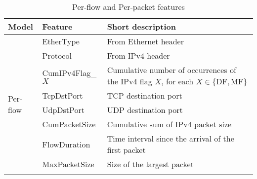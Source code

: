 \begin{table}[t]
\caption{Per-flow and Per-packet features}
\begin{tabular}{|l|l|p{4.2cm}|}
\hline
\textbf{Model}      & \textbf{Feature} & \textbf{Short description}                                                                                                                                                                \\ \hline
\multirow{11}{*}{Per-flow}  & EtherType        & From Ethernet header                                                                                                                                                                      \\ \cline{2-3} 
                            & Protocol         & From IPv4 header                                                                                                                                                                          \\ \cline{2-3} 
                            & CumIPv4Flag\_$X$ & Cumulative number of occurrences of the IPv4 flag $X$, for each $X\in\{\text{DF}, \text{MF}\}$                                                                                            \\ \cline{2-3} 
                            & TcpDstPort       & TCP destination port                                                                                                                                                                      \\ \cline{2-3} 
                            & UdpDstPort       & UDP destination port                                                                                                                                                                      \\ \cline{2-3} 
                            & CumPacketSize    & Cumulative sum of IPv4 packet size                                                                                                                                                        \\ \cline{2-3} 
                            & FlowDuration     & Time interval since the arrival of the first packet                                                                                                                                       \\ \cline{2-3} 
                            & MaxPacketSize    & Size of the largest packet                                                                                                                                                                \\ \cline{2-3} 

\end{tabular}
\end{table}
